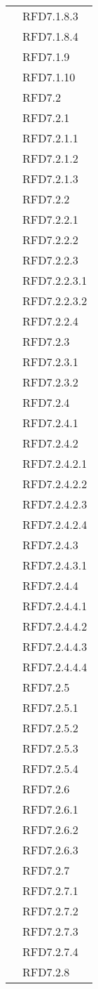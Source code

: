 \begin{longtable}{|>{\centering}m{10cm}|m{3cm}<{\centering}|}
& RFD7.1.8.3\\
& RFD7.1.8.4\\
& RFD7.1.9\\
& RFD7.1.10\\
& RFD7.2\\
& RFD7.2.1\\
& RFD7.2.1.1\\
& RFD7.2.1.2\\
& RFD7.2.1.3\\
& RFD7.2.2\\
& RFD7.2.2.1\\
& RFD7.2.2.2\\
& RFD7.2.2.3\\
& RFD7.2.2.3.1\\
& RFD7.2.2.3.2\\
& RFD7.2.2.4\\
& RFD7.2.3\\
& RFD7.2.3.1\\
& RFD7.2.3.2\\
& RFD7.2.4\\
& RFD7.2.4.1\\
& RFD7.2.4.2\\
& RFD7.2.4.2.1\\
& RFD7.2.4.2.2\\
& RFD7.2.4.2.3\\
& RFD7.2.4.2.4\\
& RFD7.2.4.3\\
& RFD7.2.4.3.1\\
& RFD7.2.4.4\\
& RFD7.2.4.4.1\\
& RFD7.2.4.4.2\\
& RFD7.2.4.4.3\\
& RFD7.2.4.4.4\\
& RFD7.2.5\\
& RFD7.2.5.1\\
& RFD7.2.5.2\\
& RFD7.2.5.3\\
& RFD7.2.5.4\\
& RFD7.2.6\\
& RFD7.2.6.1\\
& RFD7.2.6.2\\
& RFD7.2.6.3\\
& RFD7.2.7\\
& RFD7.2.7.1\\
& RFD7.2.7.2\\
& RFD7.2.7.3\\
& RFD7.2.7.4\\
& RFD7.2.8\\

\end{longtable}
